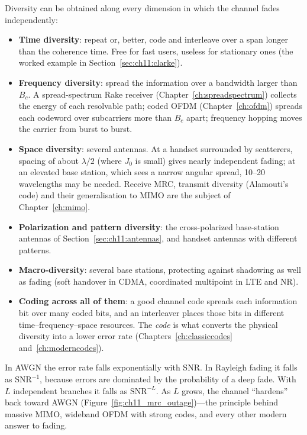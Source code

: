 Diversity can be obtained along every dimension in which the channel fades independently:
\begin{itemize}
\item \textbf{Time diversity}: repeat or, better, code and interleave over a span longer than the
coherence time. Free for fast users, useless for stationary ones (the worked example in
Section~\ref{sec:ch11:clarke}).
\item \textbf{Frequency diversity}: spread the information over a bandwidth larger than $B_c$. A
spread-spectrum Rake receiver (Chapter~\ref{ch:spreadspectrum}) collects the energy of each
resolvable path; coded OFDM (Chapter~\ref{ch:ofdm}) spreads each codeword over subcarriers more than
$B_c$ apart; frequency hopping moves the carrier from burst to burst.
\item \textbf{Space diversity}: several antennas. At a handset surrounded by scatterers, spacing of
about $\lambda/2$ (where $J_0$ is small) gives nearly independent fading; at an elevated base station,
which sees a narrow angular spread, 10--20 wavelengths may be needed. Receive MRC, transmit
diversity (Alamouti's code) and their generalisation to MIMO are the subject of Chapter~\ref{ch:mimo}.
\item \textbf{Polarization and pattern diversity}: the cross-polarized base-station antennas of
Section~\ref{sec:ch11:antennas}, and handset antennas with different patterns.
\item \textbf{Macro-diversity}: several base stations, protecting against shadowing as well as
fading (soft handover in CDMA, coordinated multipoint in LTE and NR).
\item \textbf{Coding across all of them}: a good channel code spreads each information bit over many
coded bits, and an interleaver places those bits in different time--frequency--space resources. The
\emph{code} is what converts the physical diversity into a lower error rate (Chapters~\ref{ch:classiccodes}
and~\ref{ch:moderncodes}).
\end{itemize}


\begin{keyidea}
In AWGN the error rate falls exponentially with SNR. In Rayleigh fading it falls as $\text{SNR}^{-1}$,
because errors are dominated by the probability of a deep fade. With $L$ independent branches it
falls as $\text{SNR}^{-L}$. As $L$ grows, the channel ``hardens'' back toward AWGN (Figure~\ref{fig:ch11_mrc_outage})---the principle
behind massive MIMO, wideband OFDM with strong codes, and every other modern answer to fading.
\end{keyidea}

